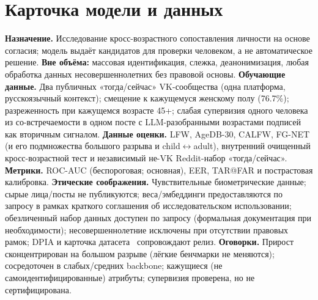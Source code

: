 \documentclass[10pt,twocolumn,letterpaper]{article}
\begin{document}
\section{Карточка модели и данных}\label{sup:card}
\textbf{Назначение.} Исследование кросс-возрастного сопоставления личности на основе согласия; модель
выдаёт кандидатов для проверки человеком, а не автоматическое решение. \textbf{Вне объёма:} массовая
идентификация, слежка, деанонимизация, любая обработка данных несовершеннолетних без правовой основы.
\textbf{Обучающие данные.} Два публичных «тогда/сейчас» VK-сообщества (одна платформа, русскоязычный
контекст); смещение к кажущемуся женскому полу (76.7\%); разреженность при кажущемся возрасте 45+; слабая
супервизия одного человека из со-встречаемости в одном посте с LLM-разобранными возрастами подписей как
вторичным сигналом. \textbf{Данные оценки.} LFW, AgeDB-30, CALFW, FG-NET (и его подмножества большого
разрыва и child$\leftrightarrow$adult), внутренний очищенный кросс-возрастной тест и независимый не-VK
Reddit-набор «тогда/сейчас». \textbf{Метрики.} ROC-AUC (беспороговая; основная), EER, TAR@FAR и
пострастовая калибровка. \textbf{Этические соображения.} Чувствительные биометрические данные; сырые
лица/посты не публикуются; веса/эмбеддинги предоставляются по запросу в рамках краткого соглашения об
исследовательском использовании; обезличенный набор данных доступен по запросу (формальная документация
при необходимости); несовершеннолетние исключены при отсутствии правовых рамок; DPIA и карточка
датасета~\cite{gebru2021datasheets} сопровождают релиз. \textbf{Оговорки.} Прирост сконцентрирован на большом разрыве (лёгкие бенчмарки не меняются); сосредоточен в слабых/средних backbone; кажущиеся (не
самоидентифицированные) атрибуты; супервизия проверена, но не сертифицирована.
\end{document}
